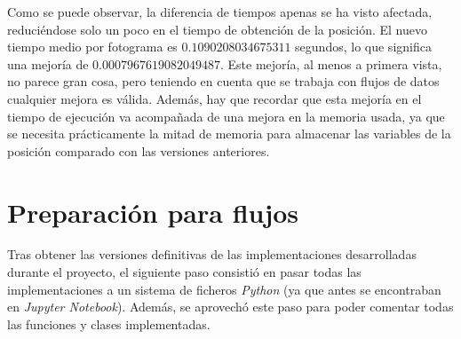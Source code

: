 \begin{table}[h]
	\centering
	\caption{Tabla con los tiempos de la ejecución con la versión reducida de la posición.}
	\label{tab:tiempos2}
\end{table}

Como se puede observar, la diferencia de tiempos apenas se ha visto afectada, reduciéndose solo un poco en el tiempo de obtención de la posición. El nuevo tiempo medio por fotograma es $0.1090208034675311$ segundos, lo que significa una mejoría de $0.0007967619082049487$. Este mejoría, al menos a primera vista, no parece gran cosa, pero teniendo en cuenta que se trabaja con flujos de datos cualquier mejora es válida. Además, hay que recordar que esta mejoría en el tiempo de ejecución va acompañada de una mejora en la memoria usada, ya que se necesita prácticamente la mitad de memoria para almacenar las variables de la posición comparado con las versiones anteriores. 

\section{Preparación para flujos}
Tras obtener las versiones definitivas de las implementaciones desarrolladas durante el proyecto, el siguiente paso consistió en pasar todas las implementaciones a un sistema de ficheros \textit{Python} (ya que antes se encontraban en \textit{Jupyter Notebook}). Además, se aprovechó este paso para poder comentar todas las funciones y clases implementadas.
